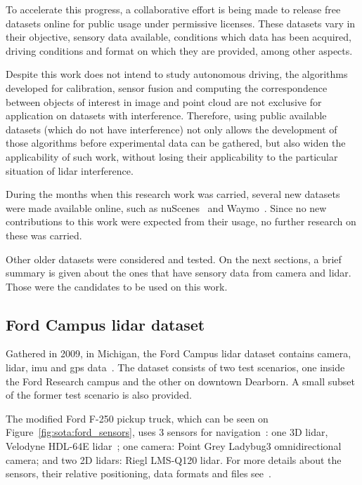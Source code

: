 To accelerate this progress, a collaborative effort is being made to release free datasets online for public usage under permissive licenses. These datasets vary in their objective, sensory data available, conditions which data has been acquired, driving conditions and format on which they are provided, among other aspects. 

Despite this work does not intend to study autonomous driving, the algorithms developed for calibration, sensor fusion and computing the correspondence between objects of interest in image and point cloud are not exclusive for application on datasets with interference. Therefore, using public available datasets (which do not have interference) not only allows the development of those algorithms before experimental data can be gathered, but also widen the applicability of such work, without losing their applicability to the particular situation of \ac{lidar} interference.

During the months when this research work was carried, several new datasets were made available online, such as nuScenes~\cite{nuScenes2019} and Waymo~\cite{Waymo}. Since no new contributions to this work were expected from their usage, no further research on these was carried. 

Other older datasets were considered and tested. On the next sections, a brief summary is given about the ones that have sensory data from camera and \ac{lidar}. Those were the candidates to be used on this work.

\subsection{Ford Campus \acl{lidar} dataset}
Gathered in 2009, in Michigan, the Ford Campus \ac{lidar} dataset contains camera, \ac{lidar}, \acf{imu} and \acf{gps} data~\cite{Pandey2011}. The dataset consists of two test scenarios, one inside the Ford Research campus and the other on downtown Dearborn. A small subset of the former test scenario is also provided.

The modified Ford F-250 pickup truck, which can be seen on Figure~\ref{fig:sota:ford_sensors}, uses 3 sensors for navigation~\cite{Pandey2011}: one 3D \ac{lidar}, Velodyne HDL-64E \ac{lidar}~\cite{VelodyneHDL64}; one camera: Point Grey Ladybug3 omnidirectional camera; and two 2D \acp{lidar}: Riegl LMS-Q120 lidar. For more details about the sensors, their relative positioning, data formats and files see~\cite{Pandey2011}.

